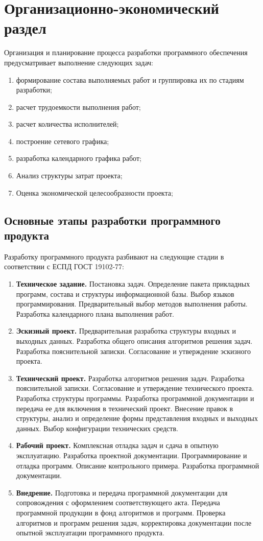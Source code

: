 \chapter{Организационно-экономический раздел}
Организация и планирование процесса разработки программного обеспечения предусматривает выполнение следующих задач:
\begin{enumerate}[1.]
\item формирование состава выполняемых работ и группировка их по стадиям разработки;
\item расчет трудоемкости выполнения работ;
\item расчет количества исполнителей;
\item построение сетевого графика;
\item разработка календарного графика работ;
\item Анализ структуры затрат проекта;
\item Оценка экономической целесообразности проекта;
\end{enumerate}

\section{Основные этапы разработки программного продукта}
Разработку программного продукта разбивают на следующие стадии в соответствии с ЕСПД ГОСТ 19102-77:
\begin{enumerate}[1.]
\item \textbf{Техническое задание.} Постановка задач. Определение пакета прикладных программ, состава и структуры информационной базы. Выбор языков программирования. Предварительный выбор методов выполнения работы. Разработка календарного плана выполнения работ.
\item \textbf{Эскизный проект.} Предварительная разработка структуры входных и выходных данных. Разработка общего описания алгоритмов решения задач. Разработка пояснительной записки. Согласование и утверждение эскизного проекта.
\item \textbf{Технический проект.} Разработка алгоритмов решения задач. Разработка пояснительной записки. Согласование и утверждение технического проекта. Разработка структуры программы. Разработка программной документации и передача ее для включения в технический проект. Внесение правок в структуры, анализ и определение формы представления входных и выходных данных. Выбор конфигурации технических средств.
\item \textbf{Рабочий проект.} Комплексная отладка задач и сдача в опытную эксплуатацию. Разработка проектной документации. Программирование и отладка программ. Описание контрольного примера. Разработка программной документации. 
\item \textbf{Внедрение.} Подготовка и передача программной документации для сопровождения с оформлением соответствующего акта. Передача программной продукции в фонд алгоритмов и программ. Проверка алгоритмов и программ решения задач, корректировка документации после опытной эксплуатации программного продукта.
\end{enumerate}

